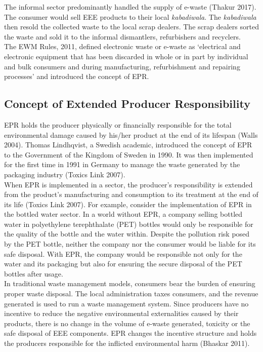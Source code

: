\documentclass[a4paper, 12pt]{article}
\begin{document}
                    The informal sector predominantly handled the supply of e-waste (Thakur 2017). The consumer would sell EEE products to their local \textit{kabadiwala}. The \textit{kabadiwala} then resold the collected waste to the local scrap dealers. The scrap dealers sorted the waste and sold it to the informal dismantlers, refurbishers and recyclers. \\
                    
                    The EWM Rules, 2011, defined electronic waste or e-waste as ‘electrical and electronic equipment that has been discarded in whole or in part by individual and bulk consumers and during manufacturing, refurbishment and repairing processes’ and introduced the concept of EPR. \\
                    
                    \subsection{Concept of Extended Producer Responsibility}
                    
                    EPR holds the producer physically or financially responsible for the total environmental damage caused by his/her product at the end of its lifespan (Walls 2004). Thomas Lindhqvist, a Swedish academic, introduced the concept of EPR to the Government of the Kingdom of Sweden in 1990. It was then implemented for the first time in 1991 in Germany to manage the waste generated by the packaging industry (Toxics Link 2007). \\
                    
                    When EPR is implemented in a sector, the producer’s responsibility is extended from the product’s manufacturing and consumption to its treatment at the end of its life (Toxics Link 2007). For example, consider the implementation of EPR in the bottled water sector. In a world without EPR, a company selling bottled water in polyethylene terephthalate (PET) bottles would only be responsible for the quality of the bottle and the water within. Despite the pollution risk posed by the PET bottle, neither the company nor the consumer would be liable for its safe disposal. With EPR, the company would be responsible not only for the water and its packaging but also for ensuring the secure disposal of the PET bottles after usage. \\
                    
                    In traditional waste management models, consumers bear the burden of ensuring proper waste disposal. The local administration taxes consumers, and the revenue generated is used to run a waste management system. Since producers have no incentive to reduce the negative environmental externalities caused by their products, there is no change in the volume of e-waste generated, toxicity or the safe disposal of EEE components. EPR changes the incentive structure and holds the producers responsible for the inflicted environmental harm (Bhaskar 2011). \\
                    
\end{document}

